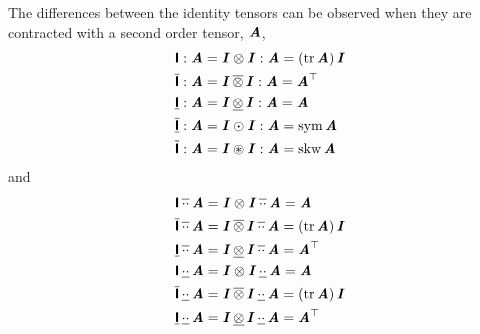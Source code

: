 The differences between the identity tensors can
be observed when they are contracted with a second order tensor,
$\boldsymbol{\mathit{A}}$, \ie
\begin{align}
  \doubledotprod{\identitytensorfour}{\tensortwo{A}}&=\doubledotprod{\tensorprod{\identitytensortwo}{\identitytensortwo}}{\tensortwo{A}}=\pbrac{\trace{}{\tensortwo{A}}}\identitytensortwo \\
  \doubledotprod{\upperidentitytensorfour}{\tensortwo{A}}&=\doubledotprod{\uppertensorprod{\identitytensortwo}{\identitytensortwo}}{\tensortwo{A}}=\transpose{\tensortwo{A}} \\
  \doubledotprod{\loweridentitytensorfour}{\tensortwo{A}}&=\doubledotprod{\lowertensorprod{\identitytensortwo}{\identitytensortwo}}{\tensortwo{A}}=\tensortwo{A}\\
  \doubledotprod{\symidentitytensorfour}{\tensortwo{A}}&=\doubledotprod{\symtensorprod{\identitytensortwo}{\identitytensortwo}}{\tensortwo{A}}=\symmetric{\tensortwo{A}}\\
  \doubledotprod{\antisymidentitytensorfour}{\tensortwo{A}}&=\doubledotprod{\antisymtensorprod{\identitytensortwo}{\identitytensortwo}}{\tensortwo{A}}=\skewsym{\tensortwo{A}}
\end{align}
and
\begin{align}
  \upperdoubledotprod{\identitytensorfour}{\tensortwo{A}}&=\upperdoubledotprod{\tensorprod{\identitytensortwo}{\identitytensortwo}}{\tensortwo{A}}=\tensortwo{A} \\
  \upperdoubledotprod{\upperidentitytensorfour}{\tensortwo{A}}&=\upperdoubledotprod{\uppertensorprod{\identitytensortwo}{\identitytensortwo}}{\tensortwo{A}}=\pbrac{\trace{}{\tensortwo{A}}}\identitytensortwo \\
  \upperdoubledotprod{\loweridentitytensorfour}{\tensortwo{A}}&=\upperdoubledotprod{\lowertensorprod{\identitytensortwo}{\identitytensortwo}}{\tensortwo{A}}=\transpose{\tensortwo{A}}\\
  \lowerdoubledotprod{\identitytensorfour}{\tensortwo{A}}&=\lowerdoubledotprod{\tensorprod{\identitytensortwo}{\identitytensortwo}}{\tensortwo{A}}=\tensortwo{A} \\
  \lowerdoubledotprod{\upperidentitytensorfour}{\tensortwo{A}}&=\lowerdoubledotprod{\uppertensorprod{\identitytensortwo}{\identitytensortwo}}{\tensortwo{A}}=\pbrac{\trace{}{\tensortwo{A}}}\identitytensortwo \\
  \lowerdoubledotprod{\loweridentitytensorfour}{\tensortwo{A}}&=\lowerdoubledotprod{\lowertensorprod{\identitytensortwo}{\identitytensortwo}}{\tensortwo{A}}=\transpose{\tensortwo{A}}\\
\end{align}

